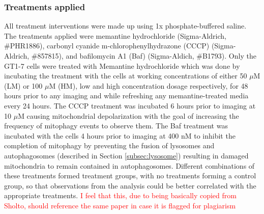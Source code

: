 \subsubsection*{Treatments applied}
All treatment interventions were made up using 1x phosphate-buffered saline. The treatments applied were memantine hydrochloride (Sigma-Aldrich, \#PHR1886), carbonyl cyanide m-chlorophenylhydrazone (CCCP) (Sigma-Aldrich, \#857815), and bafilomycin A1 (Baf) (Sigma-Aldich, \#B1793). Only the GT1-7 cells were treated with Memantine hydrochloride which was done by incubating the treatment with the cells at working concentrations of either 50 $\mu$M (LM) or 100 $\mu$M (HM), low and high concentration dosage respectively, for 48 hours prior to any imaging and while refreshing any memantine-treated media every 24 hours. The CCCP treatment was incubated 6 hours prior to imaging at 10 $\mu$M causing mitochondrial depolarization with the goal of increasing the frequency of mitophagy events to observe them. The Baf treatment was incubated with the cells 4 hours prior to imaging at 400 nM to inhibit the completion of mitophagy by preventing the fusion of lysosomes and autophagosomes (described in Section \ref{subsec:lysosome}) resulting in damaged mitochondria to remain contained in autophagosomes. Different combinations of these treatments formed treatment groups, with no treatments forming a control group, so that observations from the analysis could be better correlated with the appropriate treatments.
\textcolor{red}{I feel that this, due to being basically copied from Sholto, should reference the same paper in case it is flagged for plagiarism}
